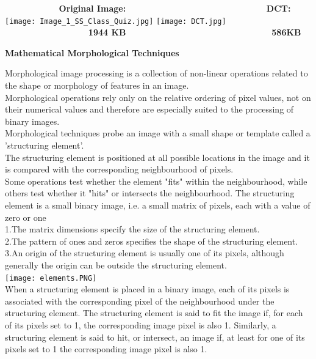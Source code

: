 \documentclass[10pt,a4paper]{article}
\begin{document}
\textbf{\ \ \ \ \ \ \ \ \ \ \ Original Image: \ \ \ \ \ \ \ \ \ \ \ \ \ \ \ \ \ \ \ \ \ \ \ \ \ \ \ \ DCT:}\\
\texttt{[image: Image\_1\_SS\_Class\_Quiz.jpg]}
\texttt{[image: DCT.jpg]}\\

\textbf{\ \ \ \ \ \ \ \ \ \ \ \ \ \ \ \ \ 1944 KB \ \ \ \ \ \ \ \ \  \ \ \ \ \ \ \ \ \ \ \ \ \ \ \ \ \ \ \ \ 586KB}\\

\begin{center}
\textbf{Mathematical Morphological Techniques}
\end{center}
Morphological image processing is a collection of non-linear operations related to the shape or morphology of features in an image.\\
Morphological operations rely only on the relative ordering of pixel values, not on their numerical values and therefore are especially suited to the processing of binary images.\\ 
Morphological techniques probe an image with a small shape or template called a 'structuring element'.\\ 
The structuring element is positioned at all possible locations in the image and it is compared with the corresponding neighbourhood of pixels.\\ 
Some operations test whether the element "fits" within the neighbourhood, while others test whether it "hits" or intersects the neighbourhood.
The structuring element is a small binary image, i.e. a small matrix of pixels, each with a value of zero or one\\
1.The matrix dimensions specify the size of the structuring element.\\
2.The pattern of ones and zeros specifies the shape of the structuring element.\\
3.An origin of the structuring element is usually one of its pixels, although generally the origin can be outside the structuring element.\\

\texttt{[image: elements.PNG]}\\
When a structuring element is placed in a binary image, each of its pixels is associated with the corresponding pixel of the neighbourhood under the structuring element. The structuring element is said to fit the image if, for each of its pixels set to 1, the corresponding image pixel is also 1. Similarly, a structuring element is said to hit, or intersect, an image if, at least for one of its pixels set to 1 the corresponding image pixel is also 1. 
\end{document}
